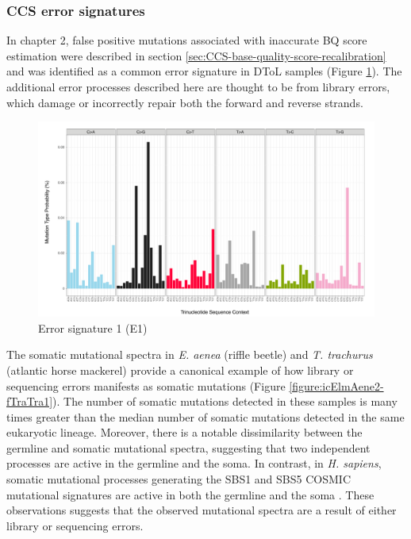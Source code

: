 \pagebreak

\subsubsection{CCS error signatures}

In chapter 2, false positive mutations associated with inaccurate BQ score estimation were described in section \ref{sec:CCS-base-quality-score-recalibration} and was identified as a common error signature in DToL samples (Figure \ref{figure:E1}). The additional error processes described here are thought to be from library errors, which damage or incorrectly repair both the forward and reverse strands. 

\begin{figure}[htbp!]
\caption{Error signature 1 (E1)}
\label{figure:E1}
\begin{centering}
\includegraphics[width=\textwidth]{Vector/E1_signature.pdf}
\end{centering}
\end{figure}

The somatic mutational spectra in \textit{E. aenea} (riffle beetle) and \textit{T. trachurus} (atlantic horse mackerel) provide a canonical example of how library or sequencing errors manifests as somatic mutations (Figure \ref{figure:icElmAene2-fTraTra1}). The number of somatic mutations detected in these samples is many times greater than the median number of somatic mutations detected in the same eukaryotic lineage. Moreover, there is a notable dissimilarity between the germline and somatic mutational spectra, suggesting that two independent processes are active in the germline and the soma. In contrast, in \textit{H. sapiens}, somatic mutational processes generating the SBS1 and SBS5 COSMIC mutational signatures are active in both the germline and the soma \cite{Moore2021-dl}. These observations suggests that the observed mutational spectra are a result of either library or sequencing errors.  

